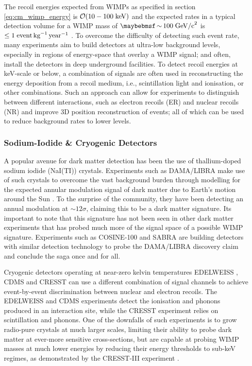 {The recoil energies expected from WIMPs as specified in section \ref{eq:cm_wimp_energy} is $\mathcal{O}(10-100 \; \text{keV})$ and the expected rates in a typical detection volume for a WIMP mass of $\sim 100 \; \MathText{GeV/c}^2$ is $\leq 1 \; \text{event} \, \text{kg}^{-1} \, \text{year}^{-1}$ \cite{Baudis_2012}. To overcome the difficulty of detecting such event rate, many experiments aim to build detectors at ultra-low background levels, especially in regions of energy-space that overlay a WIMP signal; and often, install the detectors in deep underground facilities. To detect recoil energies at keV-scale or below, a combination of signals are often used in reconstructing the energy deposition from a recoil medium, i.e., scintillation light and ionisation, or other combinations. Such an approach can allow for experiments to distinguish between different interactions, such as electron recoils (ER) and nuclear recoils (NR) and improve 3D position reconstruction of events; all of which can be used to reduce background rates to lower levels. 

\subsubsection{Sodium-Iodide \& Cryogenic Detectors}
\label{subsec:other_detectors}

A popular avenue for dark matter detection has been the use of thallium-doped sodium iodide (NaI(TI)) crystals. Experiments such as DAMA/LIBRA make use of such crystals to overcome the vast background burden through modelling for the expected annular modulation signal of dark matter due to Earth's motion around the Sun \cite{dama_libra, dama_libra_new}. To the surprise of the community, they have been detecting an annual modulation at $\sim12\sigma$, claiming this to be a dark matter signature. Its important to note that this signature has not been seen in other dark matter experiments that has probed much more of the signal space of a possible WIMP signature. Experiments such as COSINE-100 \cite{cosine_100} and SABRA \cite{sabre} are building detectors with similar detection technology to probe the DAMA/LIBRA discovery claim and conclude the saga once and for all. 

Cryogenic detectors operating at near-zero kelvin temperatures EDELWEISS \cite{edelweiss}, CDMS \cite{cdms} and CRESST \cite{cresst} can use a different combination of signal channels to achieve event-by-event discrimination between nuclear and electron recoils. The EDELWEISS and CDMS experiments detect the ionisation and phonons produced in an interaction site, while the CRESST experiment relies on scintillation and phonons. One of the downfalls of such experiments is to grow radio-pure crystals at much larger scales, limiting their ability to probe dark matter at ever-more sensitive cross-sections, but are capable at probing WIMP masses at much lower energies by reducing their energy thresholds to sub-keV regimes, as demonstrated by the CRESST-III experiment \cite{cresst_3}. 

}
